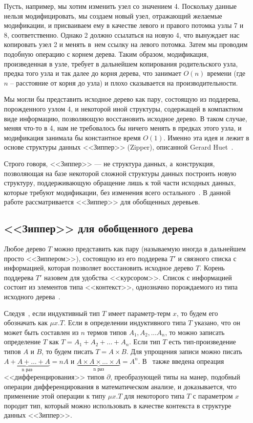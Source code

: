 Пусть, например, мы хотим изменить узел со значением 4. Поскольку данные нельзя модифицировать, мы создаем новый узел, отражающий желаемые модификации, и присваиваем ему в качестве левого и правого потомка узлы 7 и 8, соответственно. Однако 2 должно ссылаться на новую 4, что вынуждает нас копировать узел 2 и менять в~нем ссылку на левого потомка. Затем мы проводим подобную операцию с корнем дерева. Таким образом, модификация, произведенная в узле, требует в дальнейшем копирования родительского узла, предка того узла и так далее до корня дерева, что занимает $O(n)$ времени (где $n$ -- расстояние от корня до узла) и плохо сказывается на производительности.

Мы могли бы представить исходное дерево как пару, состоящую из поддерева, порожденного узлом 4, и некоторой иной структуры, содержащей в компактном виде информацию, позволяющую восстановить исходное дерево. В таком случае, меняя что-то в 4, нам не требовалось бы ничего менять в предках этого узла, и модификация занимала бы константное время $O(1)$. Именно эта идея и лежит в основе структуры данных <<Зиппер>> (Zipper), описанной Gerard Huet~\autocite{Huet1997}.

Строго говоря, <<Зиппер>> --- не структура данных, а~конструкция, позволяющая на базе некоторой сложной структуры данных построить новую структуру, поддерживающую  обращение лишь к той части исходных данных, которые требуют модификации, без изменения всего остального~\autocite{Huet1997}. В данной работе рассматривается <<Зиппер>> для обобщенных деревьев.

\subsection{<<Зиппер>> для обобщенного дерева}

Любое дерево $T$ можно представить как пару (называемую иногда в дальнейшем просто <<Зиппером>>), состоящую из его поддерева $T'$ и связного списка с информацией, которая позволяет восстановить исходное дерево $T$. Корень поддерева $T'$ назовем для удобства <<курсором>>. Список с информацией состоит из элементов типа <<контекст>>, однозначно порождаемого из типа исходного дерева~\autocite{McBride2009}.

Следуя~\autocite{McBride2009}, если индуктивный тип $T$ имеет параметр-терм $x$, то будем его обозначать как $\mu x.T$. Если в определении индуктивного типа $T$ указано, что он может быть составлен из $n$ термов типов $A_1, A_2, \dotsc A_n$, то можно записать определение $T$ как $T = A_1 + A_2 + \dotsc + A_n$. Если тип $T$ есть тип-произведение типов $A$ и $B$, то будем писать $T = A \times B$.  Для упрощения записи можно писать $\underbrace{A + A + \dotsc + A}_\text{n раз} = nA$ и $\underbrace{A \times A \times \dotsc \times A}_\text{n раз} = A^n$. В~\autocite{McBride2009} также введена опреация <<дифференцирования>> типов $\partial$, преобразующей типы на манер, подобный операции дифференцирования в математическом анализе, и доказывается, что применение этой операции к типу $\mu x. T$ для некоторого типа $T$ с параметром $x$ породит тип, который можно использовать в качестве контекста в структуре данных <<Зиппер>>.

